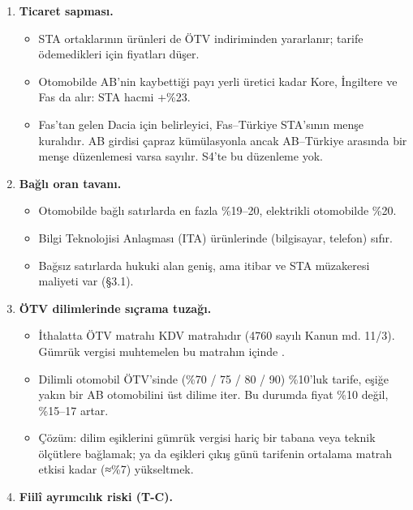 \begin{enumerate}
\def\labelenumi{\arabic{enumi}.}
\tightlist
\item
  \textbf{Ticaret sapması.}

  \begin{itemize}
  \tightlist
  \item
    STA ortaklarının ürünleri de ÖTV indiriminden yararlanır; tarife ödemedikleri için fiyatları düşer.
  \item
    Otomobilde AB'nin kaybettiği payı yerli üretici kadar Kore, İngiltere ve Fas da alır: STA hacmi +\%23.
  \item
    Fas'tan gelen Dacia için belirleyici, Fas--Türkiye STA'sının menşe kuralıdır. AB girdisi çapraz kümülasyonla ancak AB--Türkiye arasında bir menşe düzenlemesi varsa sayılır. S4'te bu düzenleme yok.
  \end{itemize}
\item
  \textbf{Bağlı oran tavanı.}

  \begin{itemize}
  \tightlist
  \item
    Otomobilde bağlı satırlarda en fazla \%19--20, elektrikli otomobilde \%20.
  \item
    Bilgi Teknolojisi Anlaşması (ITA) ürünlerinde (bilgisayar, telefon) sıfır.
  \item
    Bağsız satırlarda hukuki alan geniş, ama itibar ve STA müzakeresi maliyeti var (§3.1).
  \end{itemize}
\item
  \textbf{ÖTV dilimlerinde sıçrama tuzağı.}

  \begin{itemize}
  \tightlist
  \item
    İthalatta ÖTV matrahı KDV matrahıdır (4760 sayılı Kanun md. 11/3). Gümrük vergisi muhtemelen bu matrahın içinde \etiketD{}.
  \item
    Dilimli otomobil ÖTV'sinde (\%70 / 75 / 80 / 90) \%10'luk tarife, eşiğe yakın bir AB otomobilini üst dilime iter. Bu durumda fiyat \%10 değil, \%15--17 artar.
  \item
    Çözüm: dilim eşiklerini gümrük vergisi hariç bir tabana veya teknik ölçütlere bağlamak; ya da eşikleri çıkış günü tarifenin ortalama matrah etkisi kadar (≈\%7) yükseltmek.
  \end{itemize}
\item
  \textbf{Fiilî ayrımcılık riski (T-C).}


\end{enumerate}
